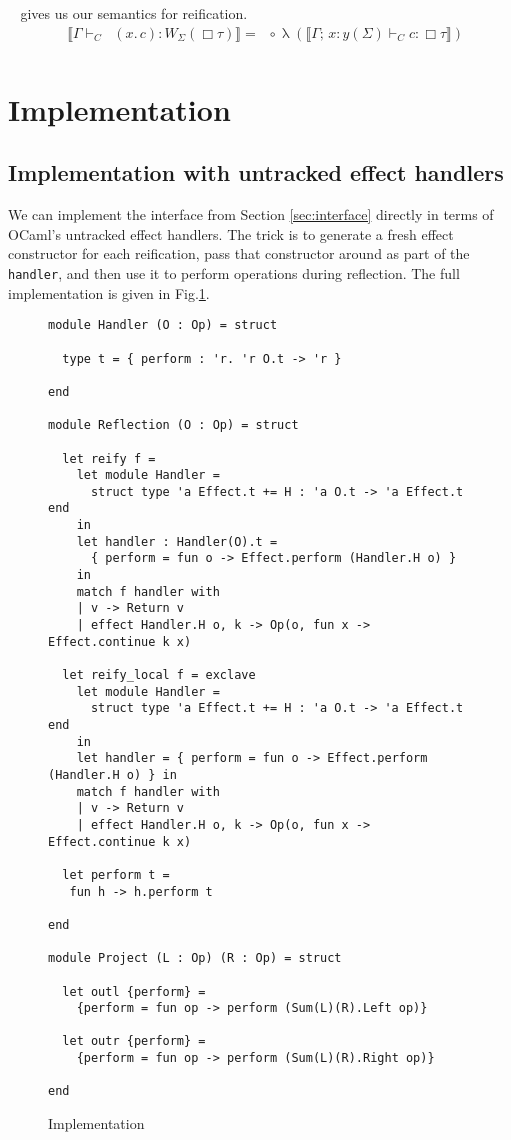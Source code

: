 \documentclass[acmsmall, screen, nonacm]{acmart}
\theoremstyle{definition}
\newcommand{\glob}{\mathop{\Box}}
\newcommand{\yoneda}[1]{y(#1)}
\newcommand{\sem}[1]{\llbracket #1 \rrbracket}
\newcommand{\reifyname}{\Downarrow}
\newcommand{\reifyraw}[1]{\mathop{\reifyname_{#1}}}
\newcommand{\reify}[3]{\reifyraw{#1}(#2.\,#3)}
\newcommand{\reifyc}[2]{\mathop{\reifyname_{#1 #2}}}
\newcommand{\ind}[1]{W_{#1}}
\newcommand{\types}{\mathrel{:}}
\newcommand{\ccons}[2]{#1;\,#2}
\newcommand{\lbind}[3]{\ccons{#1}{#2\types#3}}
\newcommand{\turnc}{\mathrel{\vdash_C}}
\newcommand{\currymap}{\mathop{\lambda}}
\begin{document}
$\reifyc{\Sigma}{}$ gives us our semantics for reification.
\begin{align*}
&\sem{\Gamma \turnc \reify{\Sigma}{x}{c} \types \ind{\Sigma}(\glob \tau)} =
  \reifyc{\Sigma}{\tau} \circ \currymap(\sem{\lbind{\Gamma}{x}{\yoneda{\Sigma}} \turnc c \types \glob \tau}) \\
\end{align*}

\section{Implementation}
\label{sec:implementation}

\subsection{Implementation with untracked effect handlers}

We can implement the interface from Section \ref{sec:interface} directly
in terms of OCaml's untracked effect
handlers\cite{Sivaramakrishnan2021retrofitting}. The trick is to
generate a fresh effect constructor for each reification, pass that
constructor around as part of the \lstinline[style=oxcaml]{handler}, and
then use it to perform operations during reflection. The full implementation
is given in Fig.\ref{fig:implementation}.
\begin{figure}
\begin{lstlisting}[style=oxcaml]
module Handler (O : Op) = struct

  type t = { perform : 'r. 'r O.t -> 'r }

end

module Reflection (O : Op) = struct

  let reify f =
    let module Handler =
      struct type 'a Effect.t += H : 'a O.t -> 'a Effect.t end
    in
    let handler : Handler(O).t =
      { perform = fun o -> Effect.perform (Handler.H o) }
    in
    match f handler with
    | v -> Return v
    | effect Handler.H o, k -> Op(o, fun x -> Effect.continue k x)

  let reify_local f = exclave
    let module Handler =
      struct type 'a Effect.t += H : 'a O.t -> 'a Effect.t end
    in
    let handler = { perform = fun o -> Effect.perform (Handler.H o) } in
    match f handler with
    | v -> Return v
    | effect Handler.H o, k -> Op(o, fun x -> Effect.continue k x)

  let perform t =
   fun h -> h.perform t

end

module Project (L : Op) (R : Op) = struct

  let outl {perform} =
    {perform = fun op -> perform (Sum(L)(R).Left op)}

  let outr {perform} =
    {perform = fun op -> perform (Sum(L)(R).Right op)}

end
\end{lstlisting}
\caption{Implementation}
\label{fig:implementation}
\end{figure}
\end{document}
